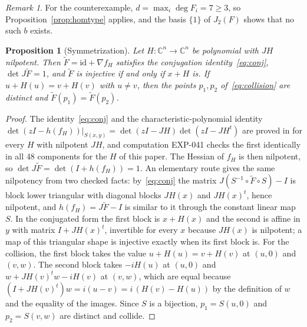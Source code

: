 \documentclass[11pt]{article}
\newtheorem{proposition}{Proposition}
\theoremstyle{remark}
\newtheorem{remark}{Remark}
\newcommand{\C}{\mathbb{C}}
\newcommand{\EXP}[1]{\mbox{EXP-#1}}
\begin{document}
\begin{remark}
For the counterexample, $d=\max_i\deg F_i=7\ge3$, so Proposition~\ref{prop:homtype} applies, and the basis $\{1\}$ of $J_2(F)$ shows that no such $b$ exists.
\end{remark}

\begin{proposition}[Symmetrization]\label{prop:sym}
Let $H:\C^n\to\C^n$ be polynomial with $JH$ nilpotent. Then $\widetilde F=\mathrm{id}+\nabla f_H$ satisfies the conjugation identity~\eqref{eq:conj}, $\det J\widetilde F=1$, and $\widetilde F$ is injective if and only if $x+H$ is. If $u+H(u)=v+H(v)$ with $u\ne v$, then the points $p_1,p_2$ of~\eqref{eq:collision} are distinct and $\widetilde F(p_1)=\widetilde F(p_2)$.
\end{proposition}
\begin{proof}
The identity~\eqref{eq:conj} and the characteristic-polynomial identity $\det(zI-h(f_H))\big|_{S(x,y)}=\det(zI-JH)\det(zI-JH^{t})$ are proved in \cite[proofs of Lemma~1.2 and Theorem~1.1, p.~2203]{dBvdE2005} for every $H$ with nilpotent $JH$, and computation \EXP{041} checks the first identically in all 48 components for the $H$ of this paper. The Hessian of $f_H$ is then nilpotent, so $\det J\widetilde F=\det(I+h(f_H))=1$. An elementary route gives the same nilpotency from two checked facts: by~\eqref{eq:conj} the matrix $J(S^{-1}\circ\widetilde F\circ S)-I$ is block lower triangular with diagonal blocks $JH(x)$ and $JH(x)^t$, hence nilpotent, and $h(f_H)=J\widetilde F-I$ is similar to it through the constant linear map $S$. In the conjugated form the first block is $x+H(x)$ and the second is affine in $y$ with matrix $I+JH(x)^t$, invertible for every $x$ because $JH(x)$ is nilpotent; a map of this triangular shape is injective exactly when its first block is. For the collision, the first block takes the value $u+H(u)=v+H(v)$ at $(u,0)$ and $(v,w)$. The second block takes $-iH(u)$ at $(u,0)$ and $w+JH(v)^tw-iH(v)$ at $(v,w)$, which are equal because $(I+JH(v)^t)w=i(u-v)=i\,(H(v)-H(u))$ by the definition of $w$ and the equality of the images. Since $S$ is a bijection, $p_1=S(u,0)$ and $p_2=S(v,w)$ are distinct and collide. \qedhere
\end{proof}
\end{document}
